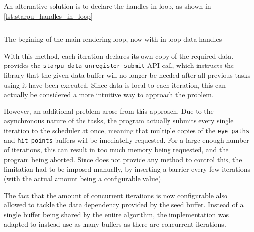 \documentclass[main.tex]{subfiles}
\begin{document}
An alternative solution is to declare the handles in-loop, as shown in \cref{lst:starpu_handles_in_loop}

\begin{listing}[htp]
  \inputminted[linenos,tabsize=4]{c++}{code/starpu_handles_in_loop.cpp}

  \caption{The begining of the main rendering loop, now with in-loop data handles}
  \label{lst:starpu_handles_in_loop}
\end{listing}

With this method, each iteration declares its own copy of the required data. \starpu provides the \texttt{starpu\_data\_unregister\_submit} API call, which instructs the library that the given data buffer will no longer be needed after all previous tasks using it have been executed. Since data is local to each iteration, this can actually be considered a more intuitive way to approach the problem.

However, an additional problem arose from this approach. Due to the asynchronous nature of the tasks, the program actually submits every single iteration to the scheduler at once, meaning that multiple copies of the \texttt{eye\_paths} and \texttt{hit\_points} buffers will be imediatelly requested. For a large enough number of iterations, this can result in too much memory being requested, and the program being aborted. Since \starpu does not provide any method to control this, the limitation had to be imposed manually, by inserting a barrier every few iterations (with the actual amount being a configurable value)

The fact that the amount of concurrent iterations is now configurable also allowed to tackle the data dependency provided by the seed buffer. Instead of a single buffer being shared by the entire algorithm, the implementation was adapted to instead use as many buffers as there are concurrent iterations.


\end{document}
